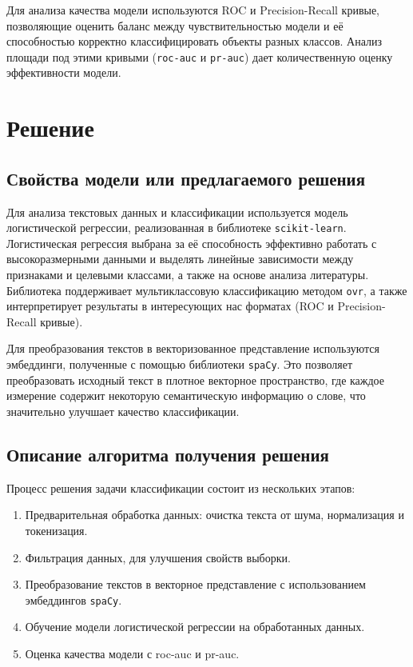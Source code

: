\documentclass{article}
\begin{document}
Для анализа качества модели используются ROC и Precision-Recall кривые, позволяющие оценить баланс между чувствительностью модели и её способностью корректно классифицировать объекты разных классов. Анализ площади под этими кривыми (\texttt{roc-auc} и \texttt{pr-auc}) дает количественную оценку эффективности модели.


\section{Решение}
\subsection{Свойства модели или предлагаемого решения}

Для анализа текстовых данных и классификации используется модель логистической регрессии, реализованная в библиотеке \texttt{scikit-learn}. Логистическая регрессия выбрана за её способность эффективно работать с высокоразмерными данными и выделять линейные зависимости между признаками и целевыми классами, а также на основе анализа литературы. Библиотека поддерживает мультиклассовую классификацию методом \texttt{ovr}, а также интерпретирует результаты в интересующих нас форматах (ROC и Precision-Recall кривые).

Для преобразования текстов в векторизованное представление используются эмбеддинги, полученные с помощью библиотеки \texttt{spaCy}. Это позволяет преобразовать исходный текст в плотное векторное пространство, где каждое измерение содержит некоторую семантическую информацию о слове, что значительно улучшает качество классификации.

\subsection{Описание алгоритма получения решения}

Процесс решения задачи классификации состоит из нескольких этапов:
\begin{enumerate}
    \item Предварительная обработка данных: очистка текста от шума, нормализация и токенизация.
    \item Фильтрация данных, для улучшения свойств выборки.
    \item Преобразование текстов в векторное представление с использованием эмбеддингов \texttt{spaCy}.
    \item Обучение модели логистической регрессии на обработанных данных.
    \item Оценка качества модели с roc-auc и pr-auc.
\end{enumerate}
\end{document}
